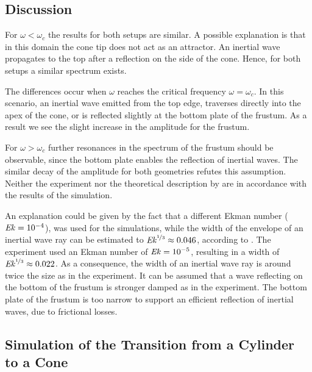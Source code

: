 \subsection{Discussion}
\label{cone:discussion_experiment}

For $\omega < \omega_c$ the results for both setups are similar.
A possible explanation is that in this domain the cone tip does not act as an attractor.
An inertial wave propagates to the top after a reflection on the side of the cone.
Hence, for both setups a similar spectrum exists.

The differences occur when $\omega$ reaches the critical frequency $\omega = \omega_c$. In this scenario, an inertial wave emitted from the
top edge, traverses directly into the apex of the cone, or is reflected slightly at the bottom plate of the frustum.
As a result we see the slight increase in the amplitude for the frustum.

For $\omega > \omega_c$ further resonances in the spectrum of the frustum should be observable,
since the bottom plate enables the reflection of inertial waves.
The similar decay of the amplitude for both geometries refutes this assumption.
Neither the experiment \citep{Beardsley1970} nor the theoretical description by \citep{Greenspan1990}
are in accordance with the results of the simulation.

An explanation could be given by the fact that a different Ekman number ($\mbox{\textit{Ek}} = 10^{-4}$), was used for the simulations,
while the width of the envelope of an inertial wave ray can be estimated to $\mbox{\textit{Ek}}^{\nicefrac{1}{3}}\approx 0.046$, according to \citep{Tilgner2000}.
The experiment used an Ekman number of $\mbox{\textit{Ek}} = 10^{-5}$, resulting in a  width of $\mbox{\textit{Ek}}^{\nicefrac{1}{3}}\approx 0.022$.
As a consequence, the width of an inertial wave ray is around twice the size as in the experiment.
It can be assumed that a wave reflecting on the bottom of the frustum
is stronger damped as in the experiment.
The bottom plate of the frustum is too narrow to support an efficient reflection
of inertial waves, due to frictional losses.\\

\subsection{Simulation of the Transition from a Cylinder to a Cone}

